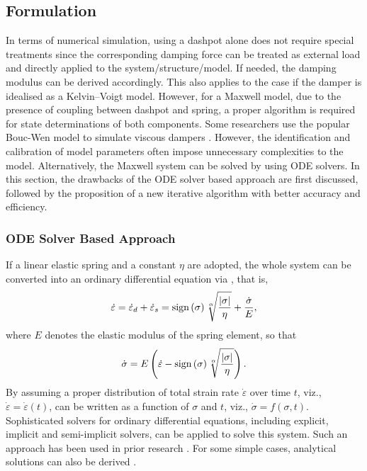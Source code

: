 \subsection{Formulation}
In terms of numerical simulation, using a dashpot alone does not require special treatments since the corresponding damping force can be treated as external load and directly applied to the system/structure/model. If needed, the damping modulus can be derived accordingly. This also applies to the case if the damper is idealised as a Kelvin--Voigt model. However, for a Maxwell model, due to the presence of coupling between dashpot and spring, a proper algorithm is required for state determinations of both components. Some researchers use the popular Bouc-Wen \cite{Wen1976} model to simulate viscous dampers \cite{Gong2016,Chang2016}. However, the identification and calibration of model parameters often impose unnecessary complexities to the model. Alternatively, the Maxwell system can be solved by using ODE solvers. In this section, the drawbacks of the ODE solver based approach are first discussed, followed by the proposition of a new iterative algorithm with better accuracy and efficiency.
\subsubsection{ODE Solver Based Approach}\label{sec:ode_issue}
If a linear elastic spring and a constant $\eta$ are adopted, the whole system can be converted into an ordinary differential equation via , that is,
\begin{gather}
\dot\varepsilon=\dot\varepsilon_d+\dot\varepsilon_s=\text{sign}\left(\sigma\right)\sqrt[\alpha]{\dfrac{\left\vert\sigma\right\vert}{\eta}}+\dfrac{\dot\sigma}{E},
\end{gather}
where $E$ denotes the elastic modulus of the spring element, so that
\begin{gather}\label{eq:maxwell_ode}
\dot\sigma=E\left(\dot\varepsilon-\text{sign}\left(\sigma\right)\sqrt[\alpha]{\dfrac{\left\vert\sigma\right\vert}{\eta}}\right).
\end{gather}
By assuming a proper distribution of total strain rate $\dot\varepsilon$ over time $t$, viz., $\dot\varepsilon=\dot\varepsilon(t)$,  can be written as a function of $\sigma$ and $t$, viz., $\dot\sigma=f(\sigma,t)$. Sophisticated solvers for ordinary differential equations, including explicit, implicit and semi-implicit solvers, can be applied to solve this system. Such an approach has been used in prior research \cite{Kasai2004,Akcelyan2018}. For some simple cases, analytical solutions can also be derived \cite{Hatada2000}.

